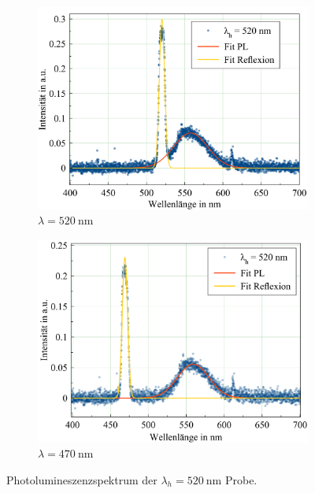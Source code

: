 \begin{figure}[H]
  \centering
  \begin{subfigure}{0.49\textwidth}
    \includegraphics[width=\textwidth]{plots/Weisslicht_520_520.png}
    \caption{$\lambda=\SI{520}{\nano\meter}$}
  \end{subfigure}
  \begin{subfigure}{0.49\textwidth}
    \includegraphics[width=\textwidth]{plots/Weisslicht_520_470.png}
    \caption{$\lambda=\SI{470}{\nano\meter}$}
  \end{subfigure}
  \caption{Photolumineszenzspektrum der $\lambda_h=\SI{520}{\nano\meter}$ Probe.}
  \label{fig:PL_520}
\end{figure}
